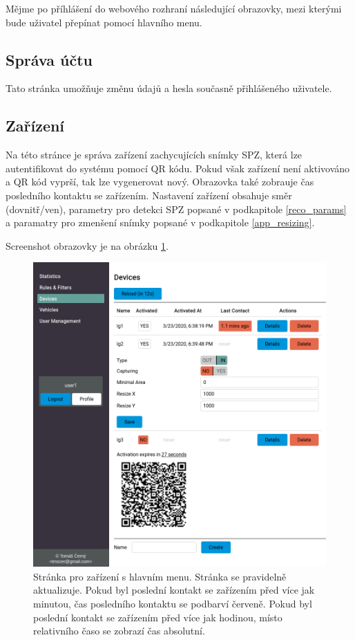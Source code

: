 \noindent
Mějme po příhlášení do webového rozhraní následující obrazovky,
mezi kterými bude uživatel přepínat pomocí hlavního menu.

\subsection{Správa účtu}

\noindent
Tato stránka umožňuje změnu údajů a hesla současně přihlášeného uživatele.

\subsection{Zařízení}

\noindent
Na této stránce je správa zařízení zachycujících snímky SPZ, která lze autentifikovat do systému pomocí
QR kódu. Pokud však zařízení není aktivováno a QR kód vyprší, tak lze vygenerovat nový.
Obrazovka také zobrauje čas posledního kontaktu se zařízením.
Nastavení zařízení obsahuje směr (dovnitř/ven), parametry pro detekci SPZ popsané v podkapitole \ref{reco_params}
a paramatry pro zmenšení snímky popsané v podkapitole \ref{app_resizing}.

Screenshot obrazovky je na obrázku \ref{fig:page_devices}.

\begin{figure} \centering
  \includegraphics[width=145mm]{../img/page_devices.png}
  \caption[Stránka pro zařízení s hlavním menu.]{Stránka pro zařízení s hlavním menu. Stránka se
  pravidelně aktualizuje. Pokud byl poslední kontakt se zařízením před více jak minutou,
  čas posledního kontaktu se podbarví červeně. Pokud byl poslední kontakt se zařízením
  před více jak hodinou, místo relativního časo se zobrazí čas absolutní.}
  \label{fig:page_devices}
\end{figure}

